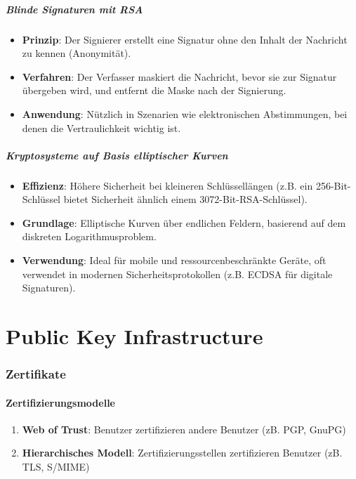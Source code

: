 \documentclass{article}
\begin{document}
\subsubsection{Blinde Signaturen mit RSA}
\begin{itemize}
  \item \textbf{Prinzip}: Der Signierer erstellt eine Signatur ohne den Inhalt der Nachricht zu kennen (Anonymität).
  \item \textbf{Verfahren}: Der Verfasser maskiert die Nachricht, bevor sie zur Signatur übergeben wird, und entfernt die Maske nach der Signierung.
  \item \textbf{Anwendung}: Nützlich in Szenarien wie elektronischen Abstimmungen, bei denen die Vertraulichkeit wichtig ist.
\end{itemize}

\subsubsection{Kryptosysteme auf Basis elliptischer Kurven}
\begin{itemize}
  \item \textbf{Effizienz}: Höhere Sicherheit bei kleineren Schlüssellängen (z.B. ein 256-Bit-Schlüssel bietet Sicherheit ähnlich einem 3072-Bit-RSA-Schlüssel).
  \item \textbf{Grundlage}: Elliptische Kurven über endlichen Feldern, basierend auf dem diskreten Logarithmusproblem.
  \item \textbf{Verwendung}: Ideal für mobile und ressourcenbeschränkte Geräte, oft verwendet in modernen Sicherheitsprotokollen (z.B. ECDSA für digitale Signaturen).
\end{itemize}



\part{Public Key Infrastructure}


\section{Zertifikate}

\subsection{Zertifizierungsmodelle}
\begin{enumerate}
  \item \textbf{Web of Trust}: Benutzer zertifizieren andere Benutzer (zB. PGP, GnuPG)
  \item \textbf{Hierarchisches Modell}: Zertifizierungsstellen zertifizieren Benutzer (zB. TLS, S/MIME)
\end{enumerate}
\end{document}
